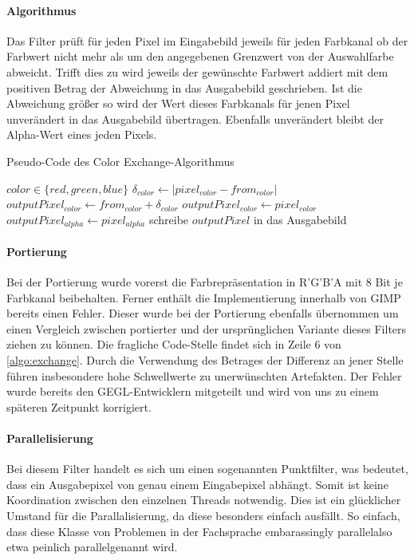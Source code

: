 \documentclass[10pt,a4paper]{article}
\providecommand{\abs}[1]{\lvert#1\rvert}
\begin{document}
\paragraph{Algorithmus} 

Das Filter prüft für jeden Pixel im Eingabebild jeweils für jeden Farbkanal ob der Farbwert nicht mehr als um den angegebenen Grenzwert von der Auswahlfarbe abweicht. Trifft dies zu wird jeweils der gewünschte Farbwert addiert mit dem positiven Betrag der Abweichung in das Ausgabebild geschrieben. Ist die Abweichung größer so wird der Wert dieses Farbkanals für jenen Pixel unverändert in das Ausgabebild übertragen. Ebenfalls unverändert bleibt der Alpha-Wert eines jeden Pixels.

\begin{algorithm}[H]
\caption{Pseudo-Code des \glqq Color Exchange\grqq-Algorithmus}
\label{algo:exchange}
\begin{algorithmic}[1]
\State $color \in \{red, green, blue\}$
  \State $\delta_{color} \gets \abs{ pixel_{color} - from_{color}}$    
      \State $outputPixel_{color} \gets from_{color} + \delta_{color}$
    \EndFor
  \Else
      \State $outputPixel_{color} \gets pixel_{color}$
    \EndFor
  \EndIf
  \State $outputPixel_{alpha} \gets pixel_{alpha}$
  \State schreibe $outputPixel$ in das Ausgabebild
\EndFor
\end{algorithmic}
\end{algorithm}

\paragraph{Portierung}
Bei der Portierung wurde vorerst die Farbrepräsentation in R'G'B'A mit 8 Bit je Farbkanal beibehalten. Ferner enthält die Implementierung innerhalb von GIMP bereits einen Fehler. Dieser wurde bei der Portierung ebenfalls übernommen um einen Vergleich zwischen portierter und der ursprünglichen Variante dieses Filters ziehen zu können. Die fragliche Code-Stelle findet sich in Zeile 6 von \autoref{algo:exchange}. Durch die Verwendung des Betrages der Differenz an jener Stelle führen insbesondere hohe Schwellwerte zu unerwünschten Artefakten. Der Fehler wurde bereits den GEGL-Entwicklern mitgeteilt und wird von uns zu einem späteren Zeitpunkt korrigiert.

\paragraph{Parallelisierung}
Bei diesem Filter handelt es sich um einen sogenannten Punktfilter, was bedeutet, dass ein Ausgabepixel von genau einem Eingabepixel abhängt. Somit ist keine Koordination zwischen den einzelnen Threads notwendig. Dies ist ein glücklicher Umstand für die Parallalisierung, da diese besonders einfach ausfällt. So einfach, dass diese Klasse von Problemen in der Fachsprache \glqq embarassingly parallel\grqq also etwa \glqq peinlich parallel\grqq genannt wird.
\end{document}
